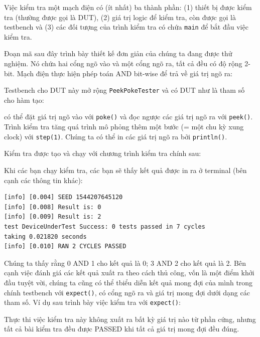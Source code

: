 \documentclass[%
    10pt,
    headinclude, footexclude,
    openright, %
    notitlepage,
    cleardoubleempty,
    headsepline,
    pointlessnumbers,
    bibtotoc, idxtotoc,
    ]{scrbook}
\newcommand{\code}[1]{{\small{\texttt{#1}}}}
\begin{document}

\noindent Việc kiểm tra một mạch điện có (ít nhất) ba thành phần: (1) thiết bị được kiểm tra (thường 
được gọi là DUT), (2) giá trị logic để kiểm tra, còn được gọi là testbench và (3) các đối tượng của trình kiểm tra 
có chứa \code{main} để bắt đầu việc kiểm tra.

Đoạn mã sau đây trình bày thiết kế đơn giản của chúng ta đang được thử nghiệm. Nó chứa hai 
cổng ngõ vào và một cổng ngõ ra, tất cả đều có độ rộng 2-bit. Mạch điện thực hiện phép toán AND bit-wise 
để trả về giá trị ngõ ra:


\noindent Testbench cho DUT này mở rộng \code{PeekPokeTester} và có DUT như là tham số cho hàm tạo:


\noindent \code{PeekPokeTester} có thể đặt giá trị ngõ vào với \code{poke()} và
đọc ngược các giá trị ngõ ra với \code{peek()}. Trình kiểm tra tăng quá trình mô phỏng thêm
một bước (= một chu kỳ xung clock) với \code{step(1)}.
Chúng ta có thể in các giá trị ngõ ra bởi \code{println()}.

Kiểm tra được tạo và chạy với chương trình kiểm tra chính sau:


\noindent Khi các bạn chạy kiểm tra, các bạn sẽ thấy kết quả được in ra ở terminal (bên cạnh các thông tin khác):

\begin{verbatim}
[info] [0.004] SEED 1544207645120
[info] [0.008] Result is: 0
[info] [0.009] Result is: 2
test DeviceUnderTest Success: 0 tests passed in 7 cycles
taking 0.021820 seconds
[info] [0.010] RAN 2 CYCLES PASSED
\end{verbatim}

\noindent Chúng ta thấy rằng 0 AND 1 cho kết quả là 0; 3 AND 2 cho kết quả là 2.
Bên cạnh việc đánh giá các kết quả xuất ra theo cách thủ công, vốn là một điểm khởi đầu tuyệt vời, chúng ta 
cũng có thể tbiểu diễn kết quả mong đợi của mình trong chính testbench với \code{expect()}, có cổng ngõ ra 
và giá trị mong đợi dưới dạng các tham số. Ví dụ sau trình bày việc kiểm tra với \code{expect()}:


\noindent Thực thi việc kiểm tra này không xuất ra bất kỳ giá trị nào từ phần cứng,
nhưng tất cả bài kiểm tra đều được PASSED khi tất cả giá trị mong đợi đều đúng.
\end{document}
